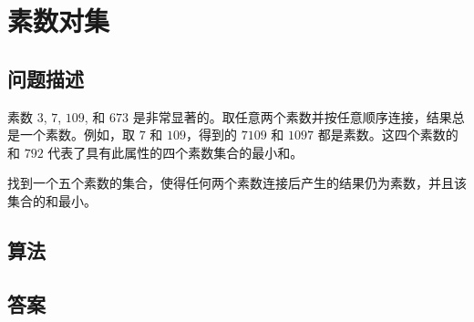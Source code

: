 \section{素数对集}
\subsection{问题描述}
\begin{tcolorbox}
素数 $3$, $7$, $109$, 和 $673$ 是非常显著的。取任意两个素数并按任意顺序连接，结果总是一个素数。例如，取 $7$ 和 $109$，得到的 $7109$ 和 $1097$ 都是素数。这四个素数的和 $792$ 代表了具有此属性的四个素数集合的最小和。

找到一个五个素数的集合，使得任何两个素数连接后产生的结果仍为素数，并且该集合的和最小。
\end{tcolorbox}

\subsection{算法}


\subsection{答案}
